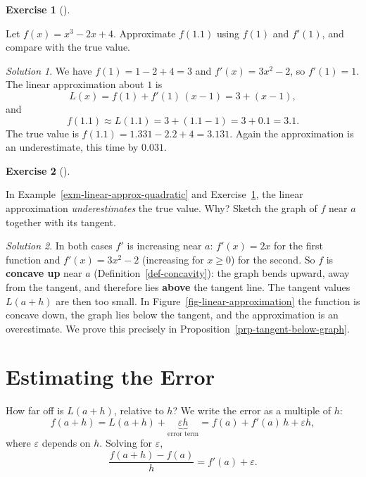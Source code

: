 \documentclass[
  letterpaper,
  DIV=11,
  numbers=noendperiod]{scrreprt}
\theoremstyle{plain}
\theoremstyle{plain}
\theoremstyle{definition}
\theoremstyle{definition}
\newtheorem{exercise}{Exercise}[chapter]
\theoremstyle{definition}
\theoremstyle{plain}
\theoremstyle{plain}
\theoremstyle{remark}
\newtheorem*{solution}{Solution}
\begin{document}
\begin{exercise}[]\protect\hypertarget{exr-linear-approx-cubic}{}\label{exr-linear-approx-cubic}

Let \(f(x) = x^3-2x+4\). Approximate \(f(1.1)\) using \(f(1)\) and
\(f'(1)\), and compare with the true value.

\end{exercise}

\begin{solution}
We have \(f(1) = 1-2+4 = 3\) and \(f'(x) = 3x^2-2\), so \(f'(1) = 1\).
The linear approximation about \(1\) is \[
L(x) = f(1) + f'(1)\,(x-1) = 3 + (x-1),
\] and \[
f(1.1) \approx L(1.1) = 3 + (1.1-1) = 3 + 0.1 = 3.1 .
\] The true value is \(f(1.1) = 1.331 - 2.2 + 4 = 3.131\). Again the
approximation is an underestimate, this time by \(0.031\).
\end{solution}

\begin{exercise}[]\protect\hypertarget{exr-why-underestimate}{}\label{exr-why-underestimate}

In Example~\ref{exm-linear-approx-quadratic} and
Exercise~\ref{exr-linear-approx-cubic}, the linear approximation
\emph{underestimates} the true value. Why? Sketch the graph of \(f\)
near \(a\) together with its tangent.

\end{exercise}

\begin{solution}
In both cases \(f'\) is increasing near \(a\): \(f'(x)=2x\) for the
first function and \(f'(x) = 3x^2-2\) (increasing for \(x\ge0\)) for the
second. So \(f\) is \textbf{concave up} near \(a\)
(Definition~\ref{def-concavity}): the graph bends upward, away from the
tangent, and therefore lies \textbf{above} the tangent line. The tangent
values \(L(a+h)\) are then too small. In
Figure~\ref{fig-linear-approximation} the function is concave down, the
graph lies below the tangent, and the approximation is an overestimate.
We prove this precisely in Proposition~\ref{prp-tangent-below-graph}.
\end{solution}

\section{Estimating the Error}\label{estimating-the-error}

How far off is \(L(a+h)\), relative to \(h\)? We write the error as a
multiple of \(h\): \[
f(a+h) = L(a+h) + \underbrace{\varepsilon h}_{\text{error term}}
       = f(a) + f'(a)\,h + \varepsilon h ,
\] where \(\varepsilon\) depends on \(h\). Solving for \(\varepsilon\),
\[
\frac{f(a+h)-f(a)}{h} = f'(a) + \varepsilon.
\]
\end{document}

